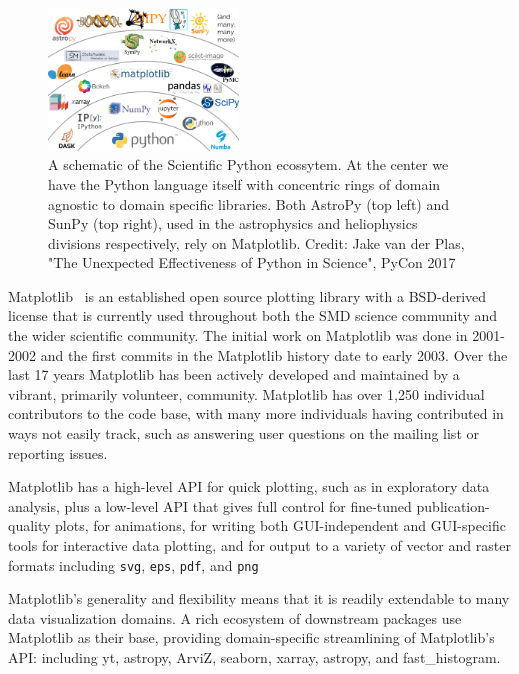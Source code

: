 \documentclass[12pt]{article}
\numberwithin{page}{section}
\begin{document}
\begin{figure}
  \includegraphics[width=0.45\textwidth]{scipy-ecosystem}
  \caption{A schematic of the Scientific Python ecossytem.  At the
    center we have the Python language itself with concentric rings of
    domain agnostic to domain specific libraries.  Both AstroPy (top
    left) and SunPy (top right), used in the astrophysics and
    heliophysics divisions respectively, rely on Matplotlib.
    Credit: Jake van der Plas, "The Unexpected Effectiveness of Python
    in Science", PyCon 2017}
  \label{fig:ecosystem}
\end{figure}



Matplotlib~\cite{Hunter:2007} is an established open source plotting
library with a BSD-derived license that is currently used throughout
both the SMD science community and the wider scientific community.
The initial work on Matplotlib was done in 2001-2002 and the first
commits in the Matplotlib history date to early 2003.  Over the last
17 years Matplotlib has been actively developed and maintained by a
vibrant, primarily volunteer, community.  Matplotlib has over 1,250
individual contributors to the code base, with many more
individuals having contributed in ways not easily track, such as
answering user questions on the mailing list or reporting issues.

Matplotlib has a high-level API for quick plotting, such as in
exploratory data analysis, plus a low-level API that gives full control for
fine-tuned publication-quality plots, for animations, for writing both
GUI-independent and GUI-specific tools for interactive data plotting, and
for output to a variety of vector and raster
formats including \texttt{svg}, \texttt{eps},
\texttt{pdf}, and \texttt{png}

Matplotlib's generality and flexibility means that it is readily extendable to
many data visualization domains.  A rich ecosystem of downstream packages use
Matplotlib as their base, providing domain-specific streamlining of
Matplotlib's API: including yt, astropy, ArviZ, seaborn, xarray, astropy, and
fast\_histogram. 
\end{document}
